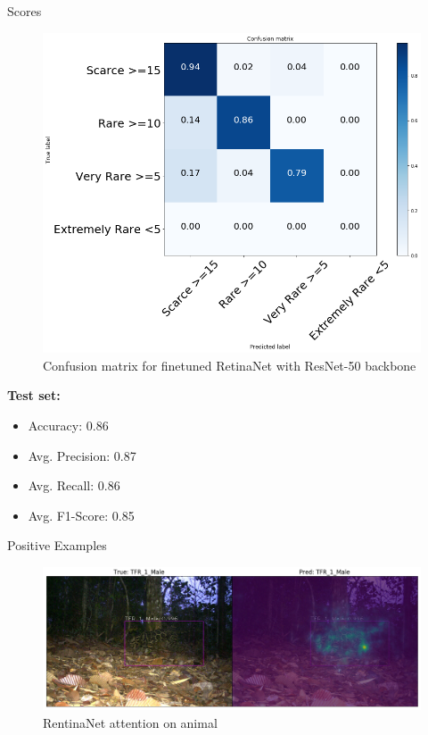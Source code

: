 \documentclass[10pt]{beamer}
\begin{document}
\begin{frame}{Scores}
	\centering
	\begin{minipage}[c]{0.58\linewidth}
		\begin{figure}
			\includegraphics[width=\columnwidth]{images/conf_mat_leo_retina.png}
			\caption{Confusion matrix for finetuned RetinaNet with ResNet-50 backbone}
		\end{figure}
	\end{minipage}
	\begin{minipage}[c]{0.38\linewidth}
		\textbf{Test set:}
		\begin{itemize}
			\item Accuracy: 0.86
			\item Avg. Precision:  0.87
			\item Avg. Recall: 0.86
			\item Avg. F1-Score: 0.85
		\end{itemize}
	\end{minipage}
\end{frame}

\begin{frame}{Positive Examples}
	\centering
	\begin{figure}
		\includegraphics[width=\columnwidth]{images/RetinaNet_Attention_correct_good_quality2.png}
		\caption{RentinaNet attention on animal}
	\end{figure}
\end{frame}
\end{document}
